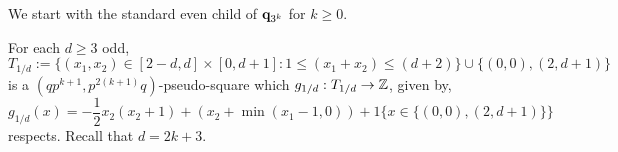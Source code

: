 \documentclass[12pt]{amsart}
\begin{document}

We start with the standard even child of $\mathbf{q}_{3^k}$ for $k \geq 0$.  %
\begin{lemma} \label{lemma:basecase_3k_even_std}
	For each $d \geq 3$ odd, 
	\[
	T_{1/d} := \{ (x_1,x_2) \in [2-d, d] \times [0,d+1]:  1 \leq (x_1+x_2) \leq (d+2)\} \cup  \{ (0, 0), (2 , d+1)\}
	\]
	 is a $(q p^{k+1}, p^{2(k+1)}q)$-pseudo-square which $g_{1/d}:T_{1/d} \to \mathbb{Z}$, given by,
	 \[
	 g_{1/d}(x) = -\frac{1}{2} x_2 (x_2 + 1) + (x_2 + \min(x_1-1,0)) + 1\{x \in \{ (0, 0), (2 , d+1)\} \} \
	 \]
	 respects. Recall that $d = 2k + 3$. 
	  
\end{lemma}
\end{document}
